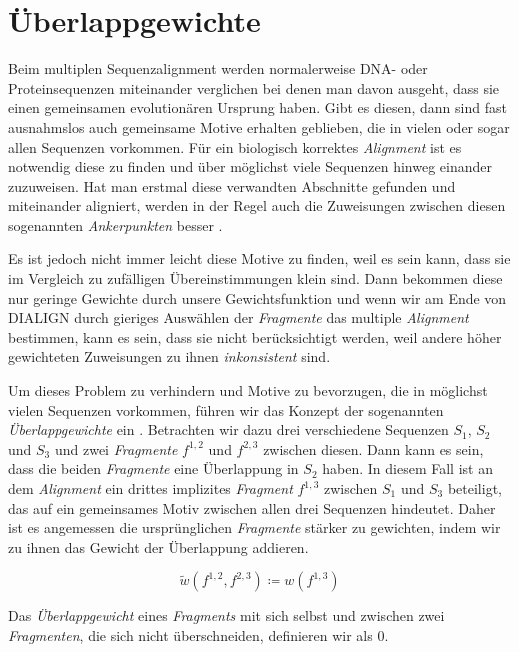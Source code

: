 \section{Überlappgewichte}

Beim multiplen Sequenzalignment werden normalerweise DNA- oder Proteinsequenzen miteinander verglichen bei denen man davon ausgeht, dass sie einen gemeinsamen evolutionären Ursprung haben. Gibt es diesen, dann sind fast ausnahmslos auch gemeinsame Motive erhalten geblieben, die in vielen oder sogar allen Sequenzen vorkommen. Für ein biologisch korrektes \emph{Alignment} ist es notwendig diese zu finden und über möglichst viele Sequenzen hinweg einander zuzuweisen. Hat man erstmal diese verwandten Abschnitte gefunden und miteinander aligniert, werden in der Regel auch die Zuweisungen zwischen diesen sogenannten \emph{Ankerpunkten} besser \citep{mpps06}.

Es ist jedoch nicht immer leicht diese Motive zu finden, weil es sein kann, dass sie im Vergleich zu zufälligen Übereinstimmungen klein sind. Dann bekommen diese nur geringe Gewichte durch unsere Gewichtsfunktion und wenn wir am Ende von DIALIGN	durch gieriges Auswählen der \emph{Fragmente} das multiple \emph{Alignment} bestimmen, kann es sein, dass sie nicht berücksichtigt werden, weil andere höher gewichteten Zuweisungen zu ihnen \emph{inkonsistent} sind. 

Um dieses Problem zu verhindern und Motive zu bevorzugen, die in möglichst vielen Sequenzen vorkommen, führen wir das Konzept der sogenannten \emph{Überlappgewichte} ein \citep{mdw96}. Betrachten wir dazu drei verschiedene Sequenzen $S_1$, $S_2$ und $S_3$ und zwei \emph{Fragmente} $f^{1,2}$ und $f^{2,3}$ zwischen diesen. Dann kann es sein, dass die beiden \emph{Fragmente} eine Überlappung in $S_2$ haben. In diesem Fall ist an dem \emph{Alignment} ein drittes implizites \emph{Fragment} $f^{1,3}$ zwischen $S_1$ und $S_3$ beteiligt, das auf ein gemeinsames Motiv zwischen allen drei Sequenzen hindeutet. Daher ist es angemessen die ursprünglichen \emph{Fragmente} stärker zu gewichten, indem wir zu ihnen das Gewicht der Überlappung addieren.

\begin{equation}
	\tilde{w}(f^{1,2},f^{2,3}) \coloneqq w(f^{1,3})
\end{equation}

Das \emph{Überlappgewicht} eines \emph{Fragments} mit sich selbst und zwischen zwei \emph{Fragmenten}, die sich nicht überschneiden, definieren wir als 0.

